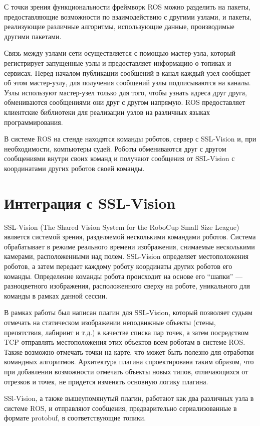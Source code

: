 \documentclass{spisok-article}
\begin{document}
С точки зрения функциональности фреймворк ROS можно разделить на пакеты, предоставляющие возможности по взаимодействию с другими узлами, и пакеты, реализующие различные алгоритмы, использующие данные, производимые другими пакетами.

Связь между узлами сети осуществляется с помощью мастер-узла, который регистрирует запущенные узлы и предоставляет информацию о топиках и сервисах. Перед началом публикации сообщений в канал каждый узел сообщает об этом мастер-узлу, для получения сообщений узлы подписываются на каналы. Узлы используют мастер-узел только для того, чтобы узнать адреса друг друга, обмениваются сообщениями они друг с другом напрямую.  ROS предоставляет клиентские библиотеки для реализации узлов на различных языках программирования.

В системе ROS на стенде находятся команды роботов, сервер с SSL-Vision и, при необходимости, компьютеры судей. Роботы обмениваются друг с другом сообщениями внутри своих команд и получают сообщения от SSL-Vision с координатами других роботов своей команды.

\section{Интеграция с SSL-Vision}

SSL-Vision (The Shared Vision System for the RoboCup Small Size League) является системой зрения, разделяемой несколькими командами роботов. Система обрабатывает в режиме реального времени изображения, снимаемые несколькими камерами, расположенными над полем. SSL-Vision определяет местоположения роботов, а затем передает каждому роботу координаты других роботов его команды. Определение команды робота происходит на основе его ``шапки'' --- разноцветного изображения, расположенного сверху на роботе, уникального для команды в рамках данной сессии.

В рамках работы был написан плагин для SSL-Vision, который позволяет судьям отмечать на статическом изображении неподвижные объекты (стены, препятствия, лабиринт и т.д.) в качестве списка пар точек, а затем посредством TCP отправлять местоположения этих объектов всем роботам в системе ROS. Также возможно отмечать точки на карте, что может быть полезно для отработки командных алгоритмов. Архитектура плагина спроектирована таким образом, что при добавлении возможности отмечать объекты новых типов, отличающихся от отрезков и точек, не придется изменять основную логику плагина.

SSl-Vision, а также вышеупомянутый плагин, работают как два различных узла в системе ROS, и отправляют сообщения, предварительно сериализованные в формате protobuf, в соответствующие топики.
\end{document}
